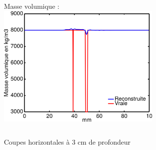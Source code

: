 \documentclass[10pt,xcolor=x11names,compress, notes=show]{beamer}%
\begin{document}
\begin{frame}{\insertsectionhead}
\begin{small}
\begin{itemize}
\begin{columns}
		\centering
		Masse volumique : \\[0.2cm]
		\includegraphics[width=0.6\textwidth]{img/multi/coupe_rho_multi.png}\\
	\end{columns}
	
\end{itemize}
\hspace{2.7cm}Coupes horizontales à 3 cm de profondeur
\end{small}
\end{frame}
\end{document}
